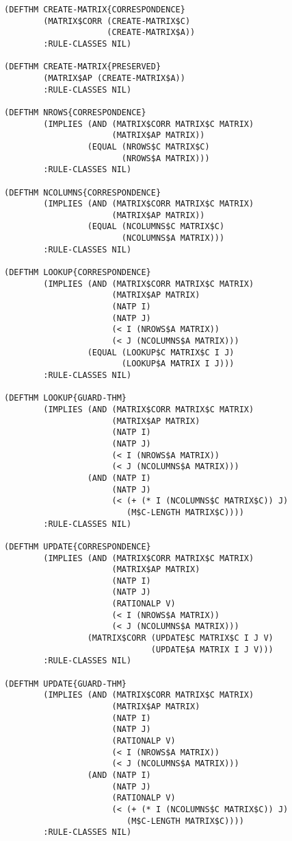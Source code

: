 \documentclass[a4paper,10pt]{article}
\begin{document}
\begin{lstlisting}[language=salidaroja]
(DEFTHM CREATE-MATRIX{CORRESPONDENCE}
        (MATRIX$CORR (CREATE-MATRIX$C)
                     (CREATE-MATRIX$A))
        :RULE-CLASSES NIL)

(DEFTHM CREATE-MATRIX{PRESERVED}
        (MATRIX$AP (CREATE-MATRIX$A))
        :RULE-CLASSES NIL)

(DEFTHM NROWS{CORRESPONDENCE}
        (IMPLIES (AND (MATRIX$CORR MATRIX$C MATRIX)
                      (MATRIX$AP MATRIX))
                 (EQUAL (NROWS$C MATRIX$C)
                        (NROWS$A MATRIX)))
        :RULE-CLASSES NIL)

(DEFTHM NCOLUMNS{CORRESPONDENCE}
        (IMPLIES (AND (MATRIX$CORR MATRIX$C MATRIX)
                      (MATRIX$AP MATRIX))
                 (EQUAL (NCOLUMNS$C MATRIX$C)
                        (NCOLUMNS$A MATRIX)))
        :RULE-CLASSES NIL)

(DEFTHM LOOKUP{CORRESPONDENCE}
        (IMPLIES (AND (MATRIX$CORR MATRIX$C MATRIX)
                      (MATRIX$AP MATRIX)
                      (NATP I)
                      (NATP J)
                      (< I (NROWS$A MATRIX))
                      (< J (NCOLUMNS$A MATRIX)))
                 (EQUAL (LOOKUP$C MATRIX$C I J)
                        (LOOKUP$A MATRIX I J)))
        :RULE-CLASSES NIL)

(DEFTHM LOOKUP{GUARD-THM}
        (IMPLIES (AND (MATRIX$CORR MATRIX$C MATRIX)
                      (MATRIX$AP MATRIX)
                      (NATP I)
                      (NATP J)
                      (< I (NROWS$A MATRIX))
                      (< J (NCOLUMNS$A MATRIX)))
                 (AND (NATP I)
                      (NATP J)
                      (< (+ (* I (NCOLUMNS$C MATRIX$C)) J)
                         (M$C-LENGTH MATRIX$C))))
        :RULE-CLASSES NIL)

(DEFTHM UPDATE{CORRESPONDENCE}
        (IMPLIES (AND (MATRIX$CORR MATRIX$C MATRIX)
                      (MATRIX$AP MATRIX)
                      (NATP I)
                      (NATP J)
                      (RATIONALP V)
                      (< I (NROWS$A MATRIX))
                      (< J (NCOLUMNS$A MATRIX)))
                 (MATRIX$CORR (UPDATE$C MATRIX$C I J V)
                              (UPDATE$A MATRIX I J V)))
        :RULE-CLASSES NIL)

(DEFTHM UPDATE{GUARD-THM}
        (IMPLIES (AND (MATRIX$CORR MATRIX$C MATRIX)
                      (MATRIX$AP MATRIX)
                      (NATP I)
                      (NATP J)
                      (RATIONALP V)
                      (< I (NROWS$A MATRIX))
                      (< J (NCOLUMNS$A MATRIX)))
                 (AND (NATP I)
                      (NATP J)
                      (RATIONALP V)
                      (< (+ (* I (NCOLUMNS$C MATRIX$C)) J)
                         (M$C-LENGTH MATRIX$C))))
        :RULE-CLASSES NIL)


\end{lstlisting}
\end{document}
